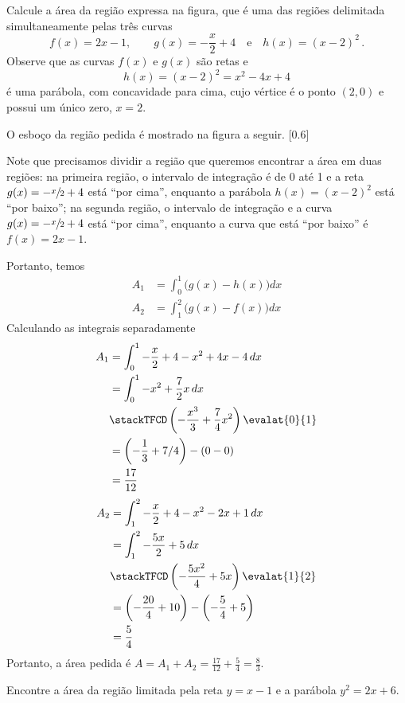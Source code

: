 \begin{example}
  Calcule a área da região  expressa na figura, que é uma das regiões
  delimitada simultaneamente pelas três curvas
  \[
    f(x) = 2x-1, \qquad
    g(x) =-\frac{x}{2}+4\quad\text{e}\quad
    h(x)=(x-2)^2 \,.
  \]
  \solution
    Observe que as curvas $f(x)$ e $g(x)$ são retas e
    \[h(x)=(x-2)^2=x^2-4x+4\]
    é uma parábola, com concavidade para cima, cujo vértice é o ponto $(2, 0)$
    e possui um único zero, $x=2$.

  O esboço da região pedida é mostrado na figura a seguir.
  [0.6]

  Note que precisamos dividir a região que queremos encontrar a área em duas
  regiões: na primeira região, o intervalo de integração é de 0 até 1
  e a reta
  $g(x) = -\sfrac{x}{2}+4$ está ``por cima'', enquanto a parábola
  $h(x)=(x-2)^2$ está ``por baixo'';
  na segunda região, o intervalo de integração e a curva
  $g(x)=-\sfrac{x}{2}+4$ está ``por cima'', enquanto a curva que está
  ``por baixo'' é
  $f(x)=2x-1$.

  Portanto, temos
  \begin{align*}
    A_1 & = \int_0^1 \big( g(x)-h(x) \big) dx \\
    A_2 & = \int_1^2 \big( g(x)-f(x) \big) dx
  \end{align*}
  Calculando as integrais separadamente
  \begin{align*}
      A_1
      & = \int_0^1 -\frac{x}{2}+4-x^2+4x-4 \, dx \\
      & = \int_0^1 -x^2 + \frac{7}{2}x \, dx \\
      & \stackTFCD \left( -\frac{x^3}{3}+\frac{7}{4}x^2 \right) \evalat{0}{1} \\
      & = \left(-\frac{1}{3}+7/4 \right)-(0-0) \\
      & =\frac{17}{12}
  \end{align*}
  \begin{align*}
      A_2
      & = \int_1^2 -\frac{x}{2}+4-x^2-2x+1 \, dx \\
      & = \int_1^2 -\frac{5x}{2}+5 \, dx \\
      & \stackTFCD \left( -\frac{5x^2}{4}+5x \right) \evalat{1}{2} \\
      & = \left(-\frac{20}{4}+10 \right)-\left(-\frac{5}{4}+5 \right) \\
      & =\frac{5}{4}
  \end{align*}
  Portanto, a área pedida é
  \(
    A
    = A_1 + A_2
    = \frac{17}{12} + \frac{5}{4}
    = \frac{8}{3}
  \).
\end{example}

\begin{example}
  Encontre a área da região limitada pela reta $y=x-1$ e a parábola $y^2=2x+6$.
\end{example}

